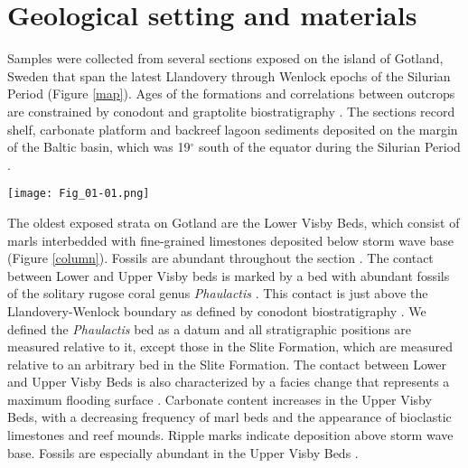 \documentclass[5p, authoryear]{elsarticle}
\begin{document}
\section{Geological setting and materials}

Samples were collected from several sections exposed on the island of Gotland, Sweden that span the latest Llandovery through Wenlock epochs of the Silurian Period (Figure \ref{map}). Ages of the formations and correlations between outcrops are constrained by conodont and graptolite biostratigraphy \citep{Jeppsson2006}. The sections record shelf, carbonate platform and backreef lagoon sediments deposited on the margin of the Baltic basin, which was 19$^{\circ}$ south of the equator during the Silurian Period \citep{Torsvik1992}. 

\begin{figure*}[t]
\centering
\texttt{[image: Fig\_01-01.png]}
\caption{Geologic map of the northern half of the island of Gotland, Sweden, modified from \cite{Calner2004a}. Approximate sample locations are marked and labeled with location number, which corresponds to the sample locations in Supplementary Table 1.}
\label{map}
\end{figure*}

The oldest exposed strata on Gotland are the Lower Visby Beds, which consist of marls interbedded with fine-grained limestones deposited below storm wave base (Figure \ref{column}). Fossils are abundant throughout the section \citep{Calner2004a, Samtleben1996}. The contact between Lower and Upper Visby beds is marked by a bed with abundant fossils of the solitary rugose coral genus \textit{Phaulactis} \citep{Jeppsson1997, Jeppsson2006, Munnecke2003, Samtleben1996}. This contact is just above the Llandovery-Wenlock boundary as defined by conodont biostratigraphy \citep{Aldridge1993, Jeppsson1983, Mabillard1985}. We defined the \textit{Phaulactis} bed as a datum and all stratigraphic positions are measured relative to it, except those in the Slite Formation, which are measured relative to an arbitrary bed in the Slite Formation. The contact between Lower and Upper Visby Beds is also characterized by a facies change that represents a maximum flooding surface \citep{Calner2004b}. Carbonate content increases in the Upper Visby Beds, with a decreasing frequency of marl beds and the appearance of bioclastic limestones and reef mounds. Ripple marks indicate deposition above storm wave base. Fossils are especially abundant in the Upper Visby Beds \citep{Calner2004a, Samtleben1996}. 
\end{document}
